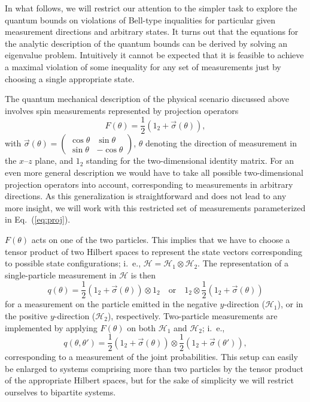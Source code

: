 \documentclass[pra,amsmath,amsfonts,showkeys,showpacs,preprint]{revtex4}
\begin{document}
In what follows, we will restrict our attention to the simpler task to
explore the quantum bounds on violations of Bell-type inqualities for
particular given measurement directions and arbitrary
states.
It turns out that the equations for the analytic description of the
quantum bounds can be derived by
solving an eigenvalue problem.
Intuitively it cannot be expected that it is feasible to
achieve a maximal violation of some inequality for any set of
measurements just by choosing a single appropriate state.

The quantum mechanical description of the physical scenario discussed
above involves spin measurements represented
by projection operators
\begin{equation}
  \label{eq:proj}
  F(\theta) = \frac{1}{2}\left(1_2+\vec{\sigma}(\theta)\right),
\end{equation}
with $\vec{\sigma}(\theta)=\left(\begin{array}{cc}\cos\theta &
  \sin\theta \\ \sin\theta & -\cos\theta\end{array}\right)$, $\theta$
denoting the direction of measurement in the $x$--$z$ plane, and $1_2$
standing for the two-dimensional identity matrix.
For an even
more general description we would have to take all possible
two-dimensional projection operators into account, corresponding to
measurements in arbitrary directions. As this generalization is
straightforward and does not lead to any more insight, we will work
with this restricted set of measurements parameterized in Eq.~(\ref{eq:proj}).

$F(\theta)$ acts on one of the two
particles.
This implies that we have to choose a tensor product of two
Hilbert
spaces to represent the state vectors corresponding to possible state
configurations; i.~e., $\mathcal{H} = \mathcal{H}_1 \otimes
\mathcal{H}_2$. The representation of a single-particle measurement in
$\mathcal{H}$ is then
\begin{equation}
\label{singleparticlemeasurement}
  q(\theta) = \frac{1}{2}\left(1_2+\vec{\sigma}(\theta)\right )\otimes
  1_2\quad \mbox{or}\quad  1_2 \otimes \frac{1}{2}\left(1_2+\vec{\sigma}(\theta)\right)
\end{equation}
for a measurement on the particle emitted in the negative $y$-direction
($\mathcal{H}_1$), or in the positive $y$-direction ($\mathcal{H}_2$), respectively. Two-particle measurements are
implemented by applying $F(\theta)$ on both $\mathcal{H}_1$
and $\mathcal{H}_2$; i.~e.,
\begin{equation}
\label{twoparticlemeasurement}
  q(\theta,\theta') = \frac{1}{2}\left(1_2+\vec{\sigma}(\theta)\right)
  \otimes \frac{1}{2}\left(1_2+\vec{\sigma}(\theta')\right),
\end{equation}
corresponding to a measurement of the joint probabilities.
This setup can easily be enlarged to systems comprising more than two
particles by the tensor product of  the appropriate Hilbert spaces,
but for the sake of simplicity we will restrict
ourselves to bipartite systems.
\end{document}
